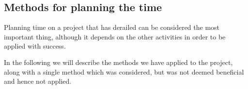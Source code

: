 \subsection{Methods for planning the time}
Planning time on a project that has derailed can be considered the most important thing, although it depends on the other activities in order to be applied with success.

In the following we will describe the methods we have applied to the project, along with a single method which was considered, but was not deemed beneficial and hence not applied.



